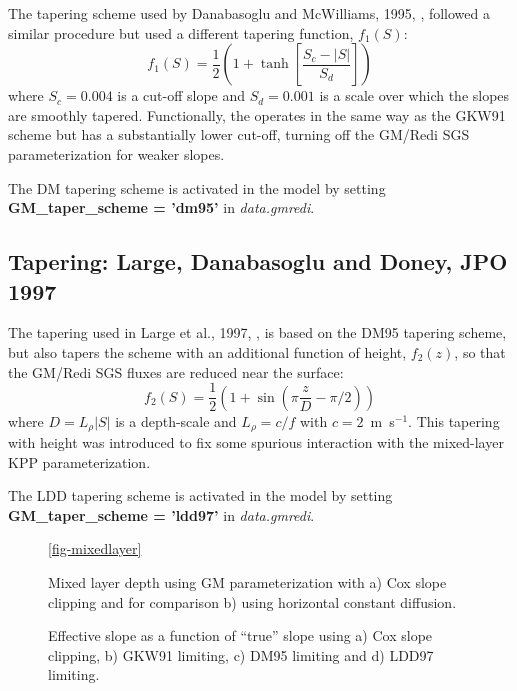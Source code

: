 The tapering scheme used by Danabasoglu and McWilliams, 1995,
\cite{DM95}, followed a similar procedure but used a different
tapering function, $f_1(S)$:
\begin{equation}
f_1(S) = \frac{1}{2} \left( 1+\tanh \left[ \frac{S_c - |S|}{S_d} \right] \right)
\end{equation}
where $S_c = 0.004$ is a cut-off slope and $S_d=0.001$ is a scale over
which the slopes are smoothly tapered. Functionally, the operates in
the same way as the GKW91 scheme but has a substantially lower
cut-off, turning off the GM/Redi SGS parameterization for weaker
slopes.

The DM tapering scheme is activated in the model by setting {\bf
GM\_tap\-er\_scheme = 'dm95'} in {\em data.gmredi}.

\subsection{Tapering: Large, Danabasoglu and Doney, JPO 1997}

The tapering used in Large et al., 1997, \cite{ldd97}, is based on the
DM95 tapering scheme, but also tapers the scheme with an additional
function of height, $f_2(z)$, so that the GM/Redi SGS fluxes are
reduced near the surface:
\begin{equation}
f_2(S) = \frac{1}{2} \left( 1 + \sin(\pi \frac{z}{D} - \pi/2)\right)
\end{equation}
where $D = L_\rho |S|$ is a depth-scale and $L_\rho=c/f$ with
$c=2$~m~s$^{-1}$.  This tapering with height was introduced to fix
some spurious interaction with the mixed-layer KPP parameterization.

The LDD tapering scheme is activated in the model by setting {\bf
GM\_tap\-er\_scheme = 'ldd97'} in {\em data.gmredi}.



\begin{figure}
\caption{Mixed layer depth using GM parameterization with a) Cox slope
clipping and for comparison b) using horizontal constant diffusion.}
\ref{fig-mixedlayer}
\end{figure}

\begin{figure}
\caption{Effective slope as a function of ``true'' slope using a) Cox
slope clipping, b) GKW91 limiting, c) DM95 limiting and d) LDD97
limiting.}
\end{figure}


